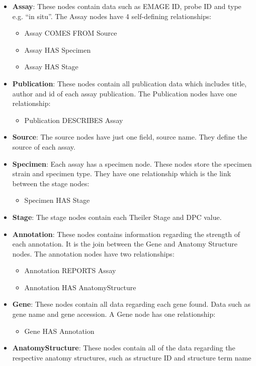 \begin{itemize}
\item \textbf{Assay}: These nodes contain data such as EMAGE ID, probe ID and type e.g. ``in situ''. The Assay nodes have 4 self-defining relationships:
\begin{itemize}
\item Assay COMES FROM Source
\item Assay HAS Specimen
\item Assay HAS Stage
\end{itemize}
\item \textbf{Publication}: These nodes contain all publication data which includes title, author and id of each assay publication. The Publication nodes have one relationship:
\begin{itemize}
\item Publication DESCRIBES Assay
\end{itemize}
\item \textbf{Source}: The source nodes have just one field, source name. They define the source of each assay.
\item \textbf{Specimen}: Each assay has a specimen node. These nodes store the specimen strain and specimen type. They have one relationship which is the link between the stage nodes:
\begin{itemize}
\item Specimen HAS Stage
\end{itemize}
\item \textbf{Stage}: The stage nodes contain each Theiler Stage and DPC value.
\item \textbf{Annotation}: These nodes contains information regarding the strength of each annotation. It is the join between the Gene and Anatomy Structure nodes. The annotation nodes have two relationships:
\begin{itemize}
\item Annotation REPORTS Assay
\item Annotation HAS AnatomyStructure
\end{itemize}
\item \textbf{Gene}: These nodes contain all data regarding each gene found. Data such as gene name and gene accession. A Gene node has one relationship:
\begin{itemize}
\item Gene HAS Annotation
\end{itemize}
\item \textbf{AnatomyStructure}: These nodes contain all of the data regarding the respective anatomy structures, such as structure ID and structure term name
\end{itemize}

